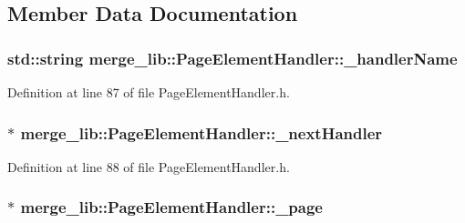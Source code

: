 \subsection{Member Data Documentation}
\hypertarget{classmerge__lib_1_1_page_element_handler_a794f4d90a0b09b60d60b00c0ebde68c6}{
\subsubsection[{\-\_\-handler\-Name}]{\setlength{\rightskip}{0pt plus 5cm}std\-::string merge\-\_\-lib\-::\-Page\-Element\-Handler\-::\-\_\-handler\-Name\hspace{0.3cm}{\ttfamily [protected]}}}\label{da/d91/classmerge__lib_1_1_page_element_handler_a794f4d90a0b09b60d60b00c0ebde68c6}


Definition at line 87 of file Page\-Element\-Handler.\-h.

\hypertarget{classmerge__lib_1_1_page_element_handler_a3f2f76c9182628763aafd37a2020b6e0}{
\subsubsection[{\-\_\-next\-Handler}]{$\ast$ merge\-\_\-lib\-::\-Page\-Element\-Handler\-::\-\_\-next\-Handler\hspace{0.3cm}{\ttfamily [protected]}}}\label{da/d91/classmerge__lib_1_1_page_element_handler_a3f2f76c9182628763aafd37a2020b6e0}


Definition at line 88 of file Page\-Element\-Handler.\-h.

\hypertarget{classmerge__lib_1_1_page_element_handler_a52d5dd4a33423e5da12fb0317303e6ab}{
\subsubsection[{\-\_\-page}]{$\ast$ merge\-\_\-lib\-::\-Page\-Element\-Handler\-::\-\_\-page\hspace{0.3cm}{\ttfamily [protected]}}}\label{da/d91/classmerge__lib_1_1_page_element_handler_a52d5dd4a33423e5da12fb0317303e6ab}


